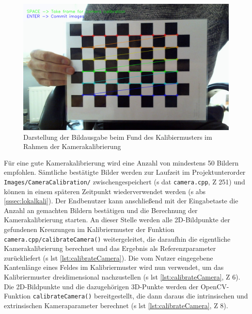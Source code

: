 \begin{figure}[H]
\centering
\includegraphics[width=13cm]{Bilder/Implementierung/live_calibration.png}
\caption{Darstellung der Bildausgabe beim Fund des Kalibiermusters im Rahmen der Kamerakalibrierung}
\label{fig:live_calibration}
\end{figure}

\noindent Für eine gute Kamerakalibrierung wird eine Anzahl von mindestens 50 Bildern empfohlen. Sämtliche bestätigte Bilder werden zur Laufzeit im Projektunterorder \glqq \texttt{Images/CameraCalibration/}\grqq{} zwischengespeichert (\acs{s} \acs{dat} \texttt{camera.cpp}, \acs{Z} 251) und können in einem späteren Zeitpunkt wiederverwendet werden (\acs{s} \acs{abs} \ref{sssec:lokalkali}). Der Endbenutzer kann anschließend mit der Eingabetaste die Anzahl an gemachten Bildern bestätigen und die Berechnung der Kamerakalibrierung starten. An dieser Stelle werden alle 2D-Bildpunkte der gefundenen Kreuzungen im Kalibriermuster der Funktion \texttt{camera.cpp/calibrateCamera()} weitergeleitet, die daraufhin die eigentliche Kamerakalibrierung berechnet und das Ergebnis als Referenzparameter zurückliefert (\acs{s} \acs{lst} \ref{lst:calibrateCamera}). Die vom Nutzer eingegebene Kantenlänge eines Feldes im Kalibriermuster wird nun verwendet, um das Kalibriermuster dreidimensional nachzustellen (\acs{s} \acs{lst} \ref{lst:calibrateCamera}, \acs{Z} 6). Die 2D-Bildpunkte und die dazugehörigen 3D-Punkte werden der OpenCV-Funktion \texttt{calibrateCamera()} bereitgestellt, die dann daraus die intrinsischen und extrinsischen Kameraparameter berechnet (\acs{s} \acs{lst} \ref{lst:calibrateCamera}, \acs{Z} 8).

